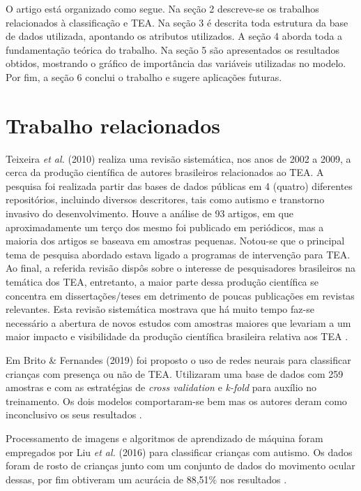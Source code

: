 \documentclass{template/sig-alternate-05-2015}
\begin{document}
O artigo está organizado como segue. Na seção 2 descreve-se os
trabalhos relacionados à classificação e TEA. Na seção 3 é descrita
toda estrutura da base de dados utilizada, apontando os atributos
utilizados. A seção 4 aborda toda a fundamentação teórica do
trabalho. Na seção 5 são apresentados os resultados obtidos, mostrando
o gráfico de importância das variáveis utilizadas no modelo. Por fim,
a seção 6 conclui o trabalho e sugere aplicações futuras.

\section{Trabalho relacionados}

Teixeira \textit{et al.} (2010) realiza uma revisão sistemática, nos
anos de 2002 a 2009, a cerca da produção científica de autores
brasileiros relacionados ao TEA. A pesquisa foi realizada partir das
bases de dados públicas em 4 (quatro) diferentes repositórios,
incluindo diversos descritores, tais como autismo e transtorno
invasivo do desenvolvimento. Houve a análise de 93 artigos, em que
aproximadamente um terço dos mesmo foi publicado em periódicos, mas a
maioria dos artigos se baseava em amostras pequenas. Notou-se que o
principal tema de pesquisa abordado estava ligado a programas de
intervenção para TEA. Ao final, a referida revisão dispôs sobre o
interesse de pesquisadores brasileiros na temática dos TEA,
entretanto, a maior parte dessa produção científica se concentra em
dissertações/teses em detrimento de poucas publicações em revistas
relevantes. Esta revisão sistemática mostrava que há muito tempo
faz-se necessário a abertura de novos estudos com amostras maiores que
levariam a um maior impacto e visibilidade da produção científica
brasileira relativa aos TEA \cite{TEIXEIRA:2010}.

Em Brito \& Fernandes (2019) foi proposto o uso de redes neurais para
classificar crianças com presença ou não de TEA. Utilizaram uma base
de dados com 259 amostras e com as estratégias de \textit{cross
  validation} e \textit{k-fold} para auxílio no treinamento. Os dois
modelos comportaram-se bem mas os autores deram como inconclusivo os
seus resultados \cite{de2019analise}.

Processamento de imagens e algoritmos de aprendizado de máquina foram
empregados por Liu \textit{et al.} (2016) para classificar crianças
com autismo. Os dados foram de rosto de crianças junto com um conjunto
de dados do movimento ocular dessas, por fim obtiveram um acurácia de
88,51$\%$ nos resultados \cite{Wenbo}.
\end{document}

